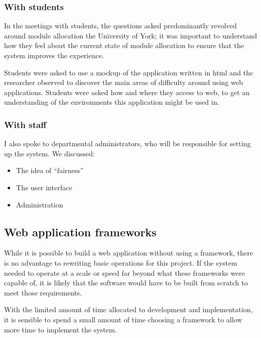 \documentclass[]{scrartcl}
\begin{document}
\subsubsection{With students}

In the meetings with students, the questions asked predominantly revolved
around module allocation the University of York; it was important to
understand how they feel about the current state of module allocation to
ensure that the system improves the experience.

Students were asked to use a mockup of the application written in \gls{html}
and the researcher observed to discover the main areas of difficulty around
using web applications. Students were asked how and where they access to web,
to get an understanding of the environments this application might be used in.


\subsubsection{With staff}

I also spoke to departmental administrators, who will be responsible for setting up
the system. We discussed:

\begin{itemize}
  \item The idea of ``fairness''
  \item The user interface
  \item Administration
\end{itemize}


\subsection{Web application frameworks}
\label{sec:webframeworks}


While it is possible to build a web application without using a framework,
there is no advantage to rewriting basic operations for this project. If the
system needed to operate at a scale or speed far beyond what these frameworks
were capable of, it is likely that the software would have to be built from
scratch to meet those requirements.

With the limited amount of time allocated to development and implementation,
it is sensible to spend a small amount of time choosing a framework to allow
more time to implement the system.
\end{document}
